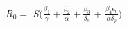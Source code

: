 \documentclass[preview]{standalone}
\begin{document}
\begin{center}
$R_0 =$ $S(\frac{\beta_1}{\gamma} + \frac{\beta_2}{\alpha} + \frac{\beta_3}{\delta_c}$ + $\frac{\beta_4 \epsilon_p}{\alpha \delta_p})$
\end{center}
\end{document}
